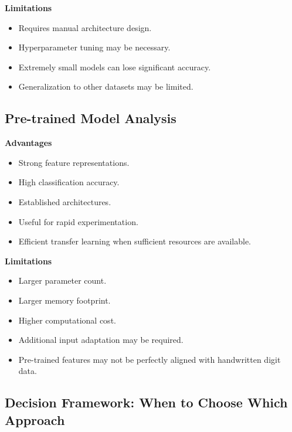 \documentclass[12pt,a4paper]{report}
\begin{document}
\textbf{Limitations}

\begin{itemize}
    \item Requires manual architecture design.
    \item Hyperparameter tuning may be necessary.
    \item Extremely small models can lose significant accuracy.
    \item Generalization to other datasets may be limited.
\end{itemize}

\subsection{Pre-trained Model Analysis}

\textbf{Advantages}

\begin{itemize}
    \item Strong feature representations.
    \item High classification accuracy.
    \item Established architectures.
    \item Useful for rapid experimentation.
    \item Efficient transfer learning when sufficient resources
    are available.
\end{itemize}

\textbf{Limitations}

\begin{itemize}
    \item Larger parameter count.
    \item Larger memory footprint.
    \item Higher computational cost.
    \item Additional input adaptation may be required.
    \item Pre-trained features may not be perfectly aligned with
    handwritten digit data.
\end{itemize}

\subsection{Decision Framework: When to Choose Which Approach}
\end{document}
